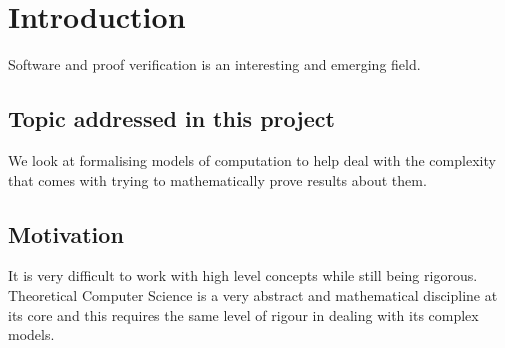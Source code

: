 \chapter{Introduction}

Software and proof verification is an interesting and emerging field.


\section{Topic addressed in this project}

We look at formalising models of computation to help deal with the complexity that comes with trying to mathematically prove results about them.


\section{Motivation}

It is very difficult to work with high level concepts while still being rigorous.
Theoretical Computer Science is a very abstract and mathematical discipline at its core and this requires the same level of rigour in dealing with its complex models.
